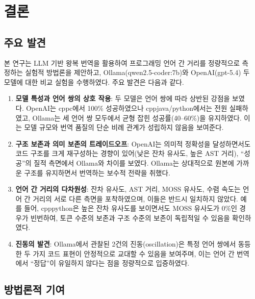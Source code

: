 \section{결론}\label{sec:conclusion}

\subsection{주요 발견}\label{ssec:findings}

본 연구는 LLM 기반 왕복 번역을 활용하여 프로그래밍 언어 간 거리를 정량적으로
측정하는 실험적 방법론을 제안하고, Ollama(qwen2.5-coder:7b)와 OpenAI(gpt-5.4)
두 모델에 대한 비교 실험을 수행하였다.
주요 발견은 다음과 같다.

\begin{enumerate}[leftmargin=2em, label=\arabic*)]
  \item \textbf{모델 특성과 언어 쌍의 상호 작용}:
    두 모델은 언어 쌍에 따라 상반된 강점을 보였다.
    OpenAI는 \textsf{cpp\rarr{}c}에서 100\% 성공하였으나
    \textsf{cpp\rarr{}java/python}에서는 전원 실패하였고,
    Ollama는 세 언어 쌍 모두에서 균형 잡힌 성공률(40--60\%)을 유지하였다.
    이는 모델 규모와 번역 품질의 단순 비례 관계가 성립하지 않음을 보여준다.

  \item \textbf{구조 보존과 의미 보존의 트레이드오프}:
    OpenAI는 의미적 정확성을 달성하면서도 코드 구조를 크게 재구성하는 경향이
    있어(낮은 잔차 유사도, 높은 AST 거리), ``성공''의 질적 측면에서 Ollama와
    차이를 보였다.
    Ollama는 상대적으로 원본에 가까운 구조를 유지하면서 번역하는 보수적 전략을
    취했다.

  \item \textbf{언어 간 거리의 다차원성}:
    잔차 유사도, AST 거리, MOSS 유사도, 수렴 속도는 언어 간 거리의 서로 다른
    측면을 포착하였으며, 이들은 반드시 일치하지 않았다.
    예를 들어, \textsf{cpp\rarr{}python}은 높은 잔차 유사도를 보이면서도
    MOSS 유사도가 $0$\%인 경우가 빈번하여, 토큰 수준의 보존과 구조 수준의 보존이
    독립적일 수 있음을 확인하였다.

  \item \textbf{진동의 발견}:
    Ollama에서 관찰된 2건의 진동(oscillation)은 특정 언어 쌍에서 동등한
    두 가지 코드 표현이 안정적으로 교대할 수 있음을 보여주며, 이는 언어 간
    번역에서 ``정답''이 유일하지 않다는 점을 정량적으로 입증하였다.
\end{enumerate}

\subsection{방법론적 기여}\label{ssec:contributions}

